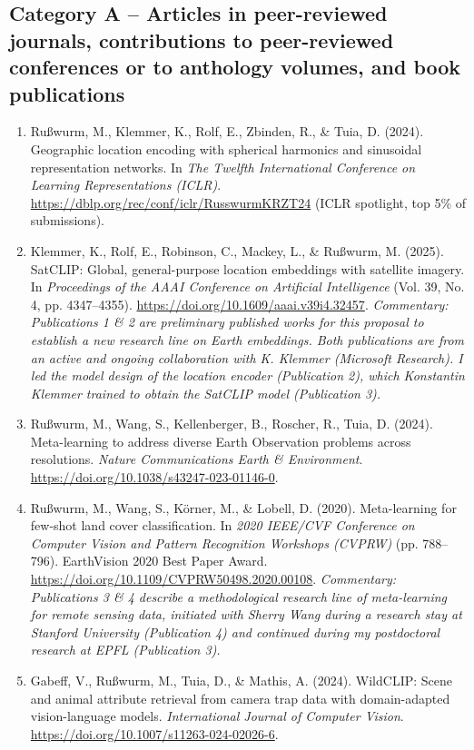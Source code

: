 \documentclass{scrartcl}
\begin{document}
\subsection*{Category A -- Articles in peer-reviewed journals, contributions to peer-reviewed conferences or to anthology volumes, and book publications}
\begin{enumerate}
    \item Ru\ss{}wurm, M., Klemmer, K., Rolf, E., Zbinden, R., \& Tuia, D. (2024). Geographic location encoding with spherical harmonics and sinusoidal representation networks. In \textit{The Twelfth International Conference on Learning Representations (ICLR)}. \url{https://dblp.org/rec/conf/iclr/RusswurmKRZT24} (ICLR spotlight, top 5\% of submissions).
    \item Klemmer, K., Rolf, E., Robinson, C., Mackey, L., \& Ru\ss{}wurm, M. (2025). SatCLIP: Global, general-purpose location embeddings with satellite imagery. In \textit{Proceedings of the AAAI Conference on Artificial Intelligence} (Vol. 39, No. 4, pp. 4347--4355). \url{https://doi.org/10.1609/aaai.v39i4.32457}. \textit{Commentary: Publications 1 \& 2 are preliminary published works for this proposal to establish a new research line on Earth embeddings. Both publications are from an active and ongoing collaboration with K. Klemmer (Microsoft Research). I led the model design of the location encoder (Publication 2), which Konstantin Klemmer trained to obtain the SatCLIP model (Publication 3).}
    \item Ru\ss{}wurm, M., Wang, S., Kellenberger, B., Roscher, R., Tuia, D. (2024). Meta-learning to address diverse Earth Observation problems across resolutions. \textit{Nature Communications Earth \& Environment}. \url{https://doi.org/10.1038/s43247-023-01146-0}.
    \item Ru\ss{}wurm, M., Wang, S., K\"orner, M., \& Lobell, D. (2020). Meta-learning for few-shot land cover classification. In \textit{2020 IEEE/CVF Conference on Computer Vision and Pattern Recognition Workshops (CVPRW)} (pp. 788--796). EarthVision 2020 Best Paper Award. \url{https://doi.org/10.1109/CVPRW50498.2020.00108}. \textit{Commentary: Publications 3 \& 4 describe a methodological research line of meta-learning for remote sensing data, initiated with Sherry Wang during a research stay at Stanford University (Publication 4) and continued during my postdoctoral research at EPFL (Publication 3).}
    \item Gabeff, V., Ru\ss{}wurm, M., Tuia, D., \& Mathis, A. (2024). WildCLIP: Scene and animal attribute retrieval from camera trap data with domain-adapted vision-language models. \textit{International Journal of Computer Vision}. \url{https://doi.org/10.1007/s11263-024-02026-6}.

\end{enumerate}
\end{document}
